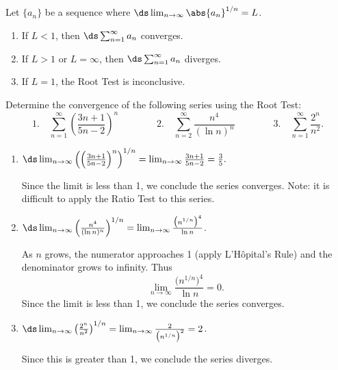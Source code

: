 \begin{theorem}\label{thm:root_test}
Let $\{a_n\}$ be a sequence %
where $\ds \lim_{n\to \infty}\abs{a_n}^{1/n} = L$.
	\begin{enumerate}
		\item If $L<1$, then $\ds\sum_{n=1}^\infty a_n$ converges.
		\item If $L>1$ or $L=\infty$, then $\ds\sum_{n=1}^\infty a_n$ diverges.
		\item If $L=1$, the Root Test is inconclusive.
	\end{enumerate}
\end{theorem}



\begin{example}\label{ex_root1}
Determine the convergence of the following series using the Root Test:
\[
 \text{1.}\quad\sum_{n=1}^\infty \left(\frac{3n+1}{5n-2}\right)^n\qquad\qquad
 \text{2.}\quad\sum_{n=2}^\infty\frac{n^4}{(\ln n)^n}\qquad\qquad
 \text{3.}\quad\sum_{n=1}^\infty \frac{2^n}{n^2}.
\]
\solution
\begin{enumerate}
	\item	$\ds\lim_{n\to\infty} \left(\left(\frac{3n+1}{5n-2}\right)^n\right)^{1/n} = \lim_{n\to\infty} \frac{3n+1}{5n-2} = \frac 35.$ 
	
	Since the limit is less than 1, we conclude the series converges. Note: it is difficult to apply the Ratio Test to this series.
	
	\item	$\ds\lim_{n\to\infty} \left(\frac{n^4}{(\ln n)^n}\right)^{1/n} = \lim_{n\to\infty} \frac {\bigl(n^{1/n}\bigr)^4}{\ln n}  $. 
	
	As $n$ grows, the numerator approaches 1 (apply L'Hôpital's Rule) and the denominator grows to infinity.  Thus
	\[\lim_{n\to\infty} \frac{\bigl(n^{1/n}\bigr)^4}{\ln n} = 0.\]
	Since the limit is less than 1, we conclude the series converges.
	
	\item	$\ds \lim_{n\to\infty} \left(\frac{2^n}{n^2}\right)^{1/n} = \lim_{n\to\infty} \frac{2}{\bigl(n^{1/n}\bigr)^2} = 2$. 
	
	Since this is greater than 1, we conclude the series diverges.
\end{enumerate}
\end{example}

